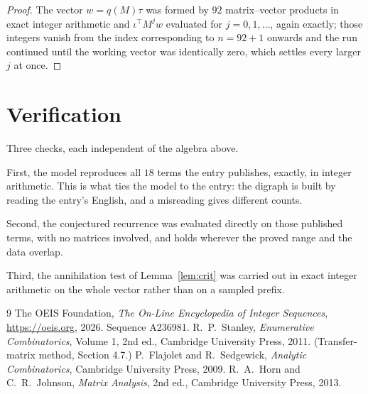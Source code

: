 \documentclass[11pt,a4paper]{article}
\theoremstyle{plain}
\theoremstyle{definition}
\begin{document}
\begin{proof}
The vector $w=q(M)\tau$ was formed by $92$ matrix--vector products in exact integer
arithmetic and $\iota^{\!\top}M^{j}w$ evaluated for $j=0,1,\dots$, again exactly; those
integers vanish from the index corresponding to $n=92+1$ onwards and the run continued
until the working vector was identically zero, which settles every larger $j$ at once.
\end{proof}

\section{Verification}

Three checks, each independent of the algebra above.

First, the model reproduces all $18$ terms the entry publishes, exactly, in integer
arithmetic. This is what ties the model to the entry: the digraph is built by reading the
entry's English, and a misreading gives different counts.

Second, the conjectured recurrence was evaluated directly on those published terms, with no
matrices involved, and holds wherever the proved range and the data overlap.

Third, the annihilation test of Lemma~\ref{lem:crit} was carried out in exact integer
arithmetic on the whole vector rather than on a sampled prefix.

\begin{thebibliography}{9}
 The OEIS Foundation, \emph{The On-Line Encyclopedia of Integer
Sequences}, \url{https://oeis.org}, 2026. Sequence A236981.
 R.~P.~Stanley, \emph{Enumerative Combinatorics}, Volume 1, 2nd ed.,
Cambridge University Press, 2011. (Transfer-matrix method, Section 4.7.)
 P.~Flajolet and R.~Sedgewick, \emph{Analytic Combinatorics}, Cambridge
University Press, 2009.
 R.~A.~Horn and C.~R.~Johnson, \emph{Matrix Analysis}, 2nd ed., Cambridge
University Press, 2013.
\end{thebibliography}
\end{document}
